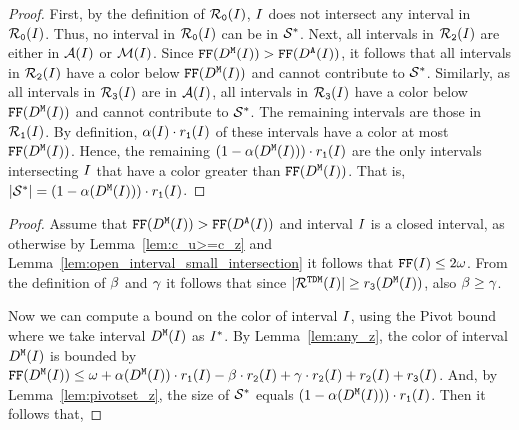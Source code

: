 {\begin{proof}
    First, by the definition of $\mathcal{R}_\texttt{0}(I)$, $I$ does not intersect any interval in $\mathcal{R}_\texttt{0}(I)$.
    Thus, no interval in $\mathcal{R}_\texttt{0}(I)$ can be in $\mathcal{S}^*$.
    Next, all intervals in $\mathcal{R}_\texttt{2}(I)$ are either in $\mathcal{A}(I)$ or $\mathcal{M}(I)$.
    Since $\text{\texttt{FF}}(D^\texttt{M}(I)) > \text{\texttt{FF}}(D^\texttt{A}(I))$, it follows that all intervals in $\mathcal{R}_\texttt{2}(I)$ have a color below $\text{\texttt{FF}}(D^\texttt{M}(I))$ and cannot contribute to $\mathcal{S}^*$.
    Similarly, as all intervals in $\mathcal{R}_\texttt{3}(I)$ are in $\mathcal{A}(I)$, all intervals in $\mathcal{R}_\texttt{3}(I)$ have a color below $\text{\texttt{FF}}(D^\texttt{M}(I))$ and cannot contribute to $\mathcal{S}^*$.
    The remaining intervals are those in $\mathcal{R}_\texttt{1}(I)$.
    By definition, $\alpha(I) \cdot r_\texttt{1}(I)$ of these intervals have a color at most $\text{\texttt{FF}}(D^\texttt{M}(I))$.
    Hence, the remaining $(1 - \alpha(D^\texttt{M}(I)) ) \cdot r_\texttt{1}(I)$ are the only intervals intersecting $I$ that have a color greater than $\text{\texttt{FF}}(D^\texttt{M}(I))$. That is, $|\mathcal{S}^*| = (1 - \alpha(D^\texttt{M}(I))) \cdot r_\texttt{1}(I)$.
\end{proof}

\medskip



\begin{proof}
    Assume that $\text{\texttt{FF}}(D^\texttt{M}(I)) > \text{\texttt{FF}}(D^\texttt{A}(I))$ and interval $I$ is a closed interval, as otherwise by Lemma~\ref{lem:c_u>=c_z} and Lemma~\ref{lem:open_interval_small_intersection} it follows that $\text{\texttt{FF}}(I) \leq 2\omega$.
    From the definition of $\beta $ and $\gamma $ it follows that since $|\mathcal{R}^{\texttt{TDM}}(I)| \geq r_\texttt{3}(D^\texttt{M}(I))$, also $\beta  \geq \gamma $.
    
    Now we can compute a bound on the color of interval $I$, using the Pivot bound where we take interval $D^\texttt{M}(I)$ as $I^*$.
    By Lemma~\ref{lem:any_z}, the color of interval $D^\texttt{M}(I)$ is bounded by $\text{\texttt{FF}}(D^\texttt{M}(I)) \leq \omega + \alpha(D^\texttt{M}(I)) \cdot r_\texttt{1}(I) - \beta  \cdot r_\texttt{2}(I) + \gamma  \cdot r_\texttt{2}(I) + r_\texttt{2}(I) + r_\texttt{3}(I)$.
    And, by Lemma~\ref{lem:pivotset_z}, the size of $\mathcal{S}^*$ equals $(1 - \alpha(D^\texttt{M}(I))) \cdot r_\texttt{1}(I)$.
    Then it follows that,


\end{proof}}
